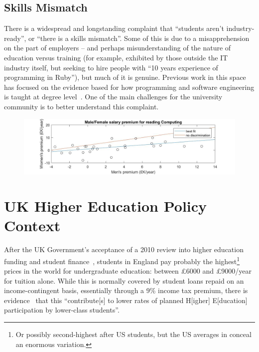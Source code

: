\documentclass[conference]{IEEEtran}
\begin{document}
\subsection{Skills Mismatch}\label{sec:Skills}

There is a widespread and longstanding complaint that ``students
aren't industry-ready'', or ``there is a skills mismatch''. Some of
this is due to a misapprehension on the part of employers -- and
perhaps misunderstanding of the nature of education versus training
(for example, exhibited by those outside the IT industry itself, but
seeking to hire people with ``10 years experience of programming in
Ruby''), but much of it is genuine. Previous work in this space has
focused on the evidence based for how programming and software
engineering is taught at degree
level~\cite{davenport-et-al:latice2016,murphy-et-al:programming2017,simon-et-al:sigcse2018}. One
of the main challenges for the university community is to better
understand this complaint.

\begin{figure}
\includegraphics[width=\textwidth]{images/BBCSalaryDatav5.jpg}
\caption{\label{fig:BBC}}
\end{figure}

\section{UK Higher Education Policy Context}\label{ukhepolicy}

After the UK Government's acceptance of a 2010 review into higher
education funding and student finance~\cite{BIS2010a}, students in
England pay probably the highest\footnote{Or possibly second-highest
after US students, but the US averages in \cite[Table B5.1]{OECD2016a}
conceal an enormous variation.} prices in the world for undergraduate
education: between \pounds6000 and \pounds9000/year for tuition
alone. While this is normally covered by student loans repaid on an
income-contingent basis, essentially through a 9\% income tax premium,
there is evidence~\cite{CallenderMason2017a} that this ``contribute[s]
to lower rates of planned H[igher] E[ducation] participation by
lower-class students''.
\end{document}
